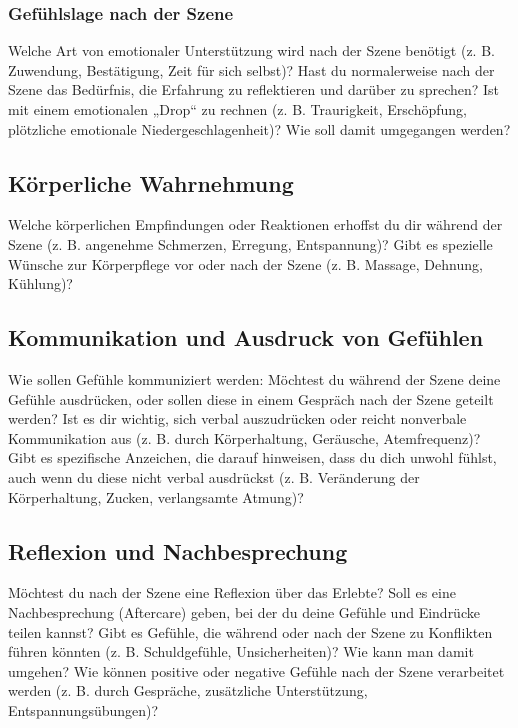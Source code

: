\documentclass[a4paper,12pt]{article}
\begin{document}
\subsubsection{Gefühlslage nach der Szene}
\noindent Welche Art von emotionaler Unterstützung wird nach der Szene benötigt (z. B. Zuwendung, Bestätigung, Zeit für sich selbst)? Hast du normalerweise nach der Szene das Bedürfnis, die Erfahrung zu reflektieren und darüber zu sprechen? Ist mit einem emotionalen „Drop“ zu rechnen (z. B. Traurigkeit, Erschöpfung, plötzliche emotionale Niedergeschlagenheit)? Wie soll damit umgegangen werden? \newline
\noindent \TextField[name=WahrNach,multiline=true,height=10em, width=37em]{}
        
\subsection{Körperliche Wahrnehmung}
\noindent Welche körperlichen Empfindungen oder Reaktionen erhoffst du dir während der Szene (z. B. angenehme Schmerzen, Erregung, Entspannung)? Gibt es spezielle Wünsche zur Körperpflege vor oder nach der Szene (z. B. Massage, Dehnung, Kühlung)? \newline
\noindent \TextField[name=WahrKoer,multiline=true,height=10em, width=37em]{}

\subsection{Kommunikation und Ausdruck von Gefühlen}
\noindent Wie sollen Gefühle kommuniziert werden: Möchtest du während der Szene deine Gefühle ausdrücken, oder sollen diese in einem Gespräch nach der Szene geteilt werden? Ist es dir wichtig, sich verbal auszudrücken oder reicht nonverbale Kommunikation aus (z. B. durch Körperhaltung, Geräusche, Atemfrequenz)? Gibt es spezifische Anzeichen, die darauf hinweisen, dass du dich unwohl fühlst, auch wenn du diese nicht verbal ausdrückst (z. B. Veränderung der Körperhaltung, Zucken, verlangsamte Atmung)?\newline
\noindent \TextField[name=WahrKomm,multiline=true,height=30em, width=37em]{}

\subsection{Reflexion und Nachbesprechung}
\noindent Möchtest du nach der Szene eine Reflexion über das Erlebte? Soll es eine Nachbesprechung (Aftercare) geben, bei der du deine Gefühle und Eindrücke teilen kannst? Gibt es Gefühle, die während oder nach der Szene zu Konflikten führen könnten (z. B. Schuldgefühle, Unsicherheiten)? Wie kann man damit umgehen? Wie können positive oder negative Gefühle nach der Szene verarbeitet werden (z. B. durch Gespräche, zusätzliche Unterstützung, Entspannungsübungen)? \newline
\noindent \TextField[name=WahrReflex,multiline=true,height=20em, width=37em]{}
\end{document}
